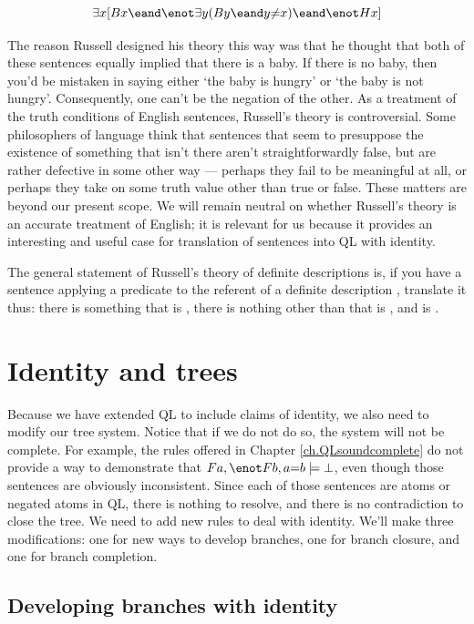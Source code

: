 \begin{equation*}
\exists x [Bx \eand \enot \exists y (By \eand y {\neq} x) \eand \enot Hx]
\end{equation*}

The reason Russell designed his theory this way was that he thought that both of these sentences equally implied that there is a baby. If there is no baby, then you'd be mistaken in saying either `the baby is hungry' or `the baby is not hungry'. Consequently, one can't be the negation of the other. As a treatment of the truth conditions of English sentences, Russell's theory is controversial. Some philosophers of language think that sentences that seem to presuppose the existence of something that isn't there aren't straightforwardly false, but are rather defective in some other way --- perhaps they fail to be meaningful at all, or perhaps they take on some truth value other than true or false. These matters are beyond our present scope. We will remain neutral on whether Russell's theory is an accurate treatment of English; it is relevant for us because it provides an interesting and useful case for translation of sentences into QL with identity.

The general statement of Russell's theory of definite descriptions is, if you have a sentence applying a predicate  to the referent of a definite description , translate it thus: there is something  that is , there is nothing other than  that is , and  is .


\section{Identity and trees}
\label{sec.identity.trees}

Because we have extended QL to include claims of identity, we also need to modify our tree system. Notice that if we do not do so, the system will not be complete. For example, the rules offered in Chapter \ref{ch.QLsoundcomplete} do not provide a way to demonstrate that $Fa, \enot Fb, a{=}b \models \bot$, even though those sentences are obviously inconsistent. Since each of those sentences are atoms or negated atoms in QL, there is nothing to resolve, and there is no contradiction to close the tree. We need to add new rules to deal with identity. We'll make three modifications: one for new ways to develop branches, one for branch closure, and one for branch completion.

\subsection{Developing branches with identity}
\label{subsec.identity.develop}

